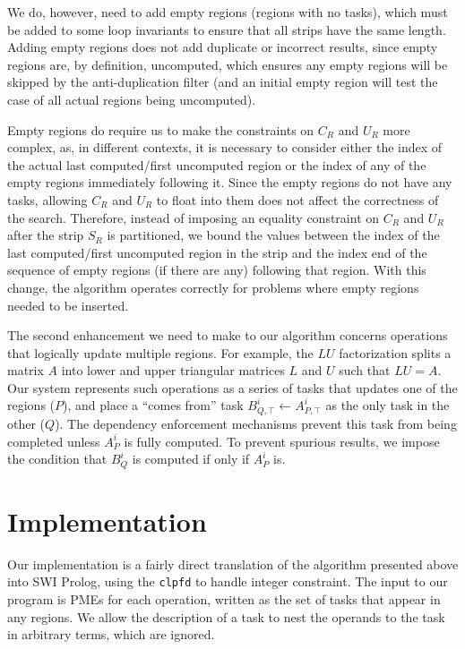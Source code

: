 \documentclass[12pt,letterpaper]{article}
\begin{document}
We do, however, need to add empty regions (regions with no tasks), which must be added to some loop invariants to ensure that all strips have the same length.
Adding empty regions does not add duplicate or incorrect results, since empty regions are, by definition, uncomputed, which ensures any empty regions will be skipped by the anti-duplication filter (and an initial empty region will test the case of all actual regions being uncomputed).

Empty regions do require us to make the constraints on $C_R$ and $U_R$ more complex, as, in different contexts, it is necessary to consider either the index of the actual last computed/first uncomputed region or the index of any of the empty regions immediately following it.
Since the empty regions do not have any tasks, allowing $C_R$ and $U_R$ to float into them does not affect the correctness of the search.
Therefore, instead of imposing an equality constraint on $C_R$ and $U_R$ after the strip $S_R$ is partitioned, we bound the values between the index of the last computed/first uncomputed region in the strip and the index end of the sequence of empty regions (if there are any) following that region.
With this change, the algorithm operates correctly for problems where empty regions needed to be inserted.

The second enhancement we need to make to our algorithm concerns operations that logically update multiple regions.
For example, the $LU$ factorization splits a matrix $A$ into lower and upper triangular matrices $L$ and $U$ such that $LU = A$.
Our system represents such operations as a series of tasks that updates one of the regions ($P$), and place a ``comes from'' task $B^i_{Q, \top} \leftarrow A^i_{P, \top}$ as the only task in the other ($Q$).
The dependency enforcement mechanisms prevent this task from being completed unless $A^i_P$ is fully computed.
To prevent spurious results, we impose the condition that $B^i_Q$ is computed if only if $A^i_P$ is.

\section{Implementation}
Our implementation is a fairly direct translation of the algorithm presented above into SWI Prolog, using the \texttt{clpfd} to handle integer constraint.
The input to our program is PMEs for each operation, written as the set of tasks that appear in any regions.
We allow the description of a task to nest the operands to the task in arbitrary terms, which are ignored.
\end{document}
